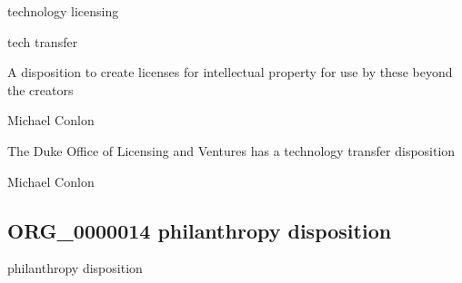 \documentclass[letterpaper,10pt,english]{sphinxmanual}
\begin{document}
\begin{sphinxShadowBox}

\sphinxAtStartPar
technology licensing

\sphinxAtStartPar
tech transfer
\end{sphinxShadowBox}

\begin{sphinxShadowBox}

\sphinxAtStartPar
A disposition to create licenses for intellectual property for use by these beyond the creators
\end{sphinxShadowBox}

\begin{sphinxShadowBox}

\sphinxAtStartPar
Michael Conlon 
\end{sphinxShadowBox}

\begin{sphinxShadowBox}

\sphinxAtStartPar
The Duke Office of Licensing and Ventures has a technology transfer disposition
\end{sphinxShadowBox}

\begin{sphinxShadowBox}

\sphinxAtStartPar
Michael Conlon 
\end{sphinxShadowBox}
\begin{quote}

\ignorespaces \end{quote}


\subsection{ORG\_0000014 \sphinxhyphen{} philanthropy disposition}
\label{\detokenize{doc-ORG_0000014:org-0000014-philanthropy-disposition}}\label{\detokenize{doc-ORG_0000014:index-0}}\label{\detokenize{doc-ORG_0000014::doc}}
\begin{sphinxShadowBox}

\sphinxAtStartPar
philanthropy disposition
\end{sphinxShadowBox}
\end{document}
